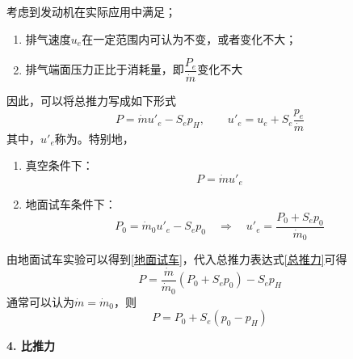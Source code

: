 考虑到发动机在实际应用中满足；\vspace*{-0.5em}
\begin{enumerate}[\hspace*{2em} (1)]
	\item 排气速度$u_e$在一定范围内可认为不变，或者变化不大；\vspace*{-0.5em}
	\item 排气端面压力正比于消耗量，即$\dfrac{P_e}{\dot{m}}$变化不大
\end{enumerate}
因此，可以将总推力写成如下形式
\begin{equation}
	P = \dot{m}u'_e - S_ep_H, \qquad u'_e = u_e + S_e \dfrac{p_e}{\dot{m}}
	\label{总推力}
\end{equation}
其中，$u'_e$称为。特别地，
\vspace*{-0.5em}
\begin{enumerate}[\hspace*{2em} (1)]
	\item 真空条件下：
	\begin{equation}
	P = \dot{m}u'_e
	\end{equation}
	\vspace*{-2em}
	\item 地面试车条件下：
	\begin{equation}
		P_0 = \dot{m}_0u'_e - S_ep_0 \quad \Rightarrow \quad u'_e = \dfrac{P_0 + S_e p_0}{\dot{m}_0}
		\label{地面试车}
	\end{equation}
\end{enumerate}

由地面试车实验可以得到\eqref{地面试车}，代入总推力表达式\eqref{总推力}可得
	\begin{equation}
		P = \dfrac{\dot{m}}{\dot{m}_0}(P_0 + S_e p_0) - S_e p_H
	\end{equation}
	通常可以认为$\dot{m} = \dot{m}_0$，则
	\begin{equation}
		P = P_0 + S_e(p_0 - p_H)
	\end{equation}

\vspace*{0.5em}


\noindent \textbf{4. 比推力}


